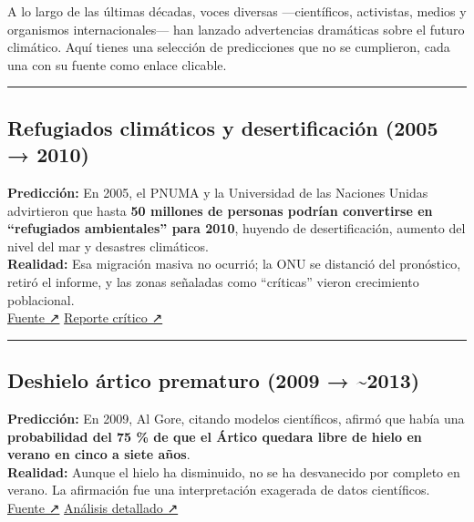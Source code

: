 \documentclass[
  11pt,
  a4paper,
  DIV=11,
  numbers=noendperiod]{scrreprt}
\begin{document}
A lo largo de las últimas décadas, voces diversas ---científicos,
activistas, medios y organismos internacionales--- han lanzado
advertencias dramáticas sobre el futuro climático. Aquí tienes una
selección de predicciones que no se cumplieron, cada una con su fuente
como enlace clicable.

\begin{center}\rule{0.5\linewidth}{0.5pt}\end{center}

\subsection{Refugiados climáticos y desertificación (2005 →
2010)}\label{refugiados-climuxe1ticos-y-desertificaciuxf3n-2005-2010}

\textbf{Predicción:} En 2005, el PNUMA y la Universidad de las Naciones
Unidas advirtieron que hasta \textbf{50 millones de personas podrían
convertirse en ``refugiados ambientales'' para 2010}, huyendo de
desertificación, aumento del nivel del mar y desastres climáticos.\\
\textbf{Realidad:} Esa migración masiva no ocurrió; la ONU se distanció
del pronóstico, retiró el informe, y las zonas señaladas como
``críticas'' vieron crecimiento poblacional.\\
\href{https://www.theguardian.com/environment/2005/oct/12/naturaldisasters.climatechange1}{Fuente
↗} \textbar{}
\href{https://climate-diplomacy.org/magazine/conflict/un-embarrassed-forecast-climate-refugees}{Reporte
crítico ↗}

\begin{center}\rule{0.5\linewidth}{0.5pt}\end{center}

\subsection{Deshielo ártico prematuro (2009 →
\textasciitilde2013)}\label{deshielo-uxe1rtico-prematuro-2009-2013}

\textbf{Predicción:} En 2009, Al Gore, citando modelos científicos,
afirmó que había una \textbf{probabilidad del 75 \% de que el Ártico
quedara libre de hielo en verano en cinco a siete años}.\\
\textbf{Realidad:} Aunque el hielo ha disminuido, no se ha desvanecido
por completo en verano. La afirmación fue una interpretación exagerada
de datos científicos.\\
\href{https://www.reuters.com/article/fact-check/al-gore-did-not-predict-ice-caps-melting-by-2013-but-misrepresented-data-idUSL1N2RV0K6}{Fuente
↗} \textbar{}
\href{https://www.politifact.com/factchecks/2023/may/31/alex-epstein/chart-on-arctic-sea-ice-extent-has-no-bearing-on-a/}{Análisis
detallado ↗}
\end{document}

